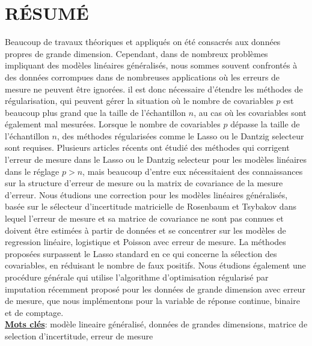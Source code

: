 \documentclass[a4paper,12pt,openany]{report}
\theoremstyle{plain}
\theoremstyle{plain}
\theoremstyle{plain}
\theoremstyle{plain}
\theoremstyle{plain}
\theoremstyle{plain}
\theoremstyle{plain}
\theoremstyle{plain}
\theoremstyle{plain}
\theoremstyle{plain}
\theoremstyle{plain}
\theoremstyle{plain}
\begin{document}
\chapter*{R\'ESUM\'E}
\noindent
Beaucoup de travaux th\'{e}oriques et appliqu\'{e}s on \'{e}t\'{e} consacr\'{e}s aux donn\'{e}es propres de grande dimension. Cependant, dans de nombreux probl\`{e}mes impliquant des mod\`{e}les lin\'{e}aires g\'{e}n\'{e}ralis\'{e}s, nous sommes souvent confront\'{e}s \`{a} des donn\'{e}es corrompues dans de nombreuses applications o\`{u} les erreurs de mesure ne peuvent \^{e}tre ignor\'{e}es. il est donc n\'{e}cessaire d'\'{e}tendre les m\'{e}thodes de r\'{e}gularisation, qui peuvent g\'{e}rer la situation o\`{u} le nombre de covariables $p$ est beaucoup plus grand que la taille de l'\'{e}chantillon $n$, au cas o\`{u} les covariables sont \'{e}galement mal mesur\'{e}es. Lorsque le nombre de covariables $p$ d\'{e}passe la taille de l'\'{e}chantillon $n$, des m\'{e}thodes r\'{e}gularis\'{e}es comme le Lasso ou le Dantzig selecteur sont requises. Plusieurs articles r\'{e}cents ont \'{e}tudi\'{e} des m\'{e}thodes qui corrigent l'erreur de mesure dans le Lasso ou le Dantzig selecteur pour les mod\`{e}les lin\'{e}aires dans le r\'{e}glage $p>n$, mais beaucoup d'entre eux n\'{e}cessitaient des connaissances sur la structure d'erreur de mesure ou la matrix de covariance de la mesure d'erreur. Nous \'{e}tudions une correction pour les mod\`{e}les lin\'{e}aires g\'{e}n\'{e}ralis\'{e}s, bas\'{e}e sur le s\'{e}lecteur d'incertitude matricielle de Rosenbaum et Tsybakov dans lequel l'erreur de mesure et sa matrice de covariance ne sont pas connues et doivent \^{e}tre estim\'{e}es \`{a} partir de donn\'{e}es et se concentrer sur les mod\`{e}les de regression lin\'{e}aire, logistique et Poisson avec erreur de mesure. La m\'{e}thodes propos\'{e}es surpassent le Lasso standard en ce qui concerne la s\'{e}lection des covariables, en r\'{e}duisant le nombre de faux positifs. Nous \'{e}tudions \'{e}galement une proc\'{e}dure g\'{e}n\'{e}rale qui utilise l'algorithme d'optimisation r\'{e}gularis\'{e} par imputation r\'{e}cemment propos\'{e} pour les donn\'{e}es de grande dimension avec erreur de mesure, que nous impl\'{e}mentons pour la variable de r\'{e}ponse continue, binaire et de comptage.
	\\ 
	\underline{\textbf{Mots cl\'es}}: mod\`{e}le lineaire g\'{e}n\'{e}ralis\'{e}, donn\'{e}es de grandes dimensions, matrice de selection d'incertitude, erreur de mesure   
\end{document}
